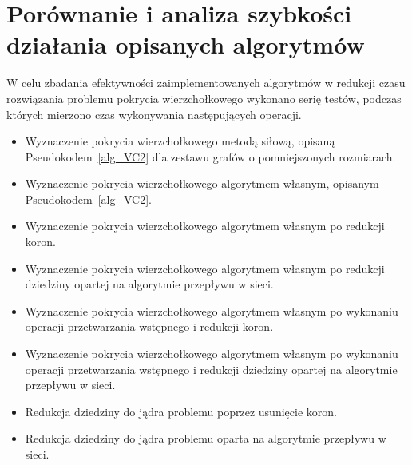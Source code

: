 \section{Porównanie i analiza szybkości działania opisanych algorytmów}
\par{
  W celu zbadania efektywności zaimplementowanych algorytmów w redukcji czasu rozwiązania problemu pokrycia wierzchołkowego wykonano serię testów, podczas których mierzono czas wykonywania następujących operacji.
  \begin{itemize}
    \item Wyznaczenie pokrycia wierzchołkowego metodą siłową, opisaną Pseudokodem~\ref{alg_VC2} dla zestawu grafów o pomniejszonych rozmiarach.
    \item Wyznaczenie pokrycia wierzchołkowego algorytmem własnym, opisanym Pseudokodem~\ref{alg_VC2}.
    \item Wyznaczenie pokrycia wierzchołkowego algorytmem własnym po redukcji koron.
    \item Wyznaczenie pokrycia wierzchołkowego algorytmem własnym po redukcji dziedziny opartej na algorytmie przepływu w sieci.
    \item Wyznaczenie pokrycia wierzchołkowego algorytmem własnym po wykonaniu operacji przetwarzania wstępnego i redukcji koron.
    \item Wyznaczenie pokrycia wierzchołkowego algorytmem własnym po wykonaniu operacji przetwarzania wstępnego i redukcji dziedziny opartej na algorytmie przepływu w sieci.
    \item Redukcja dziedziny do jądra problemu poprzez usunięcie koron.
    \item Redukcja dziedziny do jądra problemu oparta na algorytmie przepływu w sieci.
  \end{itemize}
}
